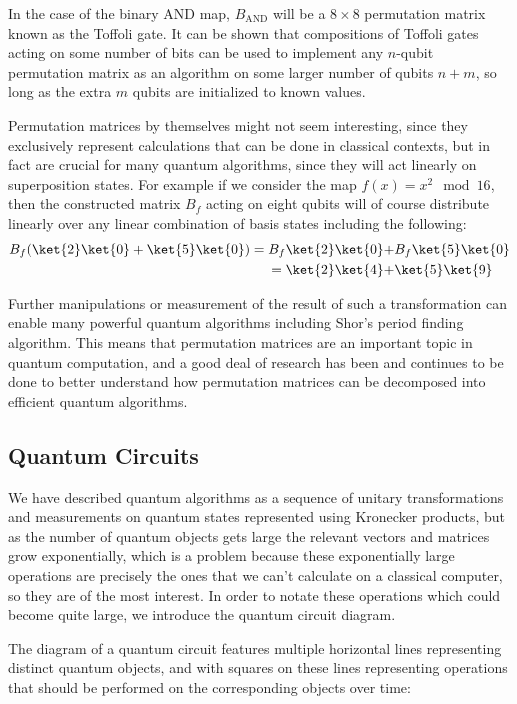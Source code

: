 In the case of the binary AND map, $B_{\text{AND}}$ will be a $8\times8$ permutation matrix known as the Toffoli gate. It can be shown that compositions of Toffoli gates acting on some number of bits can be used to implement any $n$-qubit permutation matrix as an algorithm on some larger number of qubits $n+m$, so long as the extra $m$ qubits are initialized to known values.

Permutation matrices by themselves might not seem interesting, since they exclusively represent calculations that can be done in classical contexts, but in fact are crucial for many quantum algorithms, since they will act linearly on superposition states. For example if we consider the map $f(x) = x^2\mod 16$, then the constructed matrix $B_f$ acting on eight qubits will of course distribute linearly over any linear combination of basis states including the following:
\begin{align*}
	B_f(\ket{2}\ket{0}+\ket{5}\ket{0}) 
	= B_f\ket{2}\ket{0} +& B_f\ket{5}\ket{0}
	\\= \ket{2}\ket{4} +& \ket{5}\ket{9}
\end{align*}

Further manipulations or measurement of the result of such a transformation can enable many powerful quantum algorithms including Shor's period finding algorithm. This means that permutation matrices are an important topic in quantum computation, and a good deal of research has been and continues to be done to better understand how permutation matrices can be decomposed into efficient quantum algorithms.

\subsection{Quantum Circuits}
We have described quantum algorithms as a sequence of unitary transformations and measurements on quantum states represented using Kronecker products, but as the number of quantum objects gets large the relevant vectors and matrices grow exponentially, which is a problem because these exponentially large operations are precisely the ones that we can't calculate on a classical computer, so they are of the most interest. In order to notate these operations which could become quite large, we introduce the quantum circuit diagram.

The diagram of a quantum circuit features multiple horizontal lines representing distinct quantum objects, and with squares on these lines representing operations that should be performed on the corresponding objects over time:

